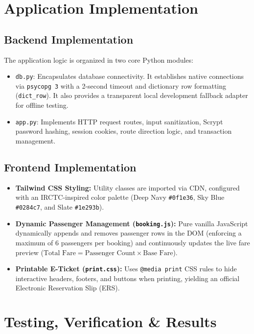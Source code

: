 \documentclass[12pt,a4paper]{report}
\begin{document}
\chapter{Application Implementation}

\section{Backend Implementation}
The application logic is organized in two core Python modules:
\begin{itemize}
    \item \texttt{db.py}: Encapsulates database connectivity. It establishes native connections via \texttt{psycopg 3} with a 2-second timeout and dictionary row formatting (\texttt{dict\_row}). It also provides a transparent local development fallback adapter for offline testing.
    \item \texttt{app.py}: Implements HTTP request routes, input sanitization, Scrypt password hashing, session cookies, route direction logic, and transaction management.
\end{itemize}

\section{Frontend Implementation}
\begin{itemize}
    \item \textbf{Tailwind CSS Styling:} Utility classes are imported via CDN, configured with an IRCTC-inspired color palette (Deep Navy \texttt{\#0f1e36}, Sky Blue \texttt{\#0284c7}, and Slate \texttt{\#1e293b}).
    \item \textbf{Dynamic Passenger Management (\texttt{booking.js}):} Pure vanilla JavaScript dynamically appends and removes passenger rows in the DOM (enforcing a maximum of 6 passengers per booking) and continuously updates the live fare preview ($\text{Total Fare} = \text{Passenger Count} \times \text{Base Fare}$).
    \item \textbf{Printable E-Ticket (\texttt{print.css}):} Uses \texttt{@media print} CSS rules to hide interactive headers, footers, and buttons when printing, yielding an official Electronic Reservation Slip (ERS).
\end{itemize}

\chapter{Testing, Verification \& Results}
\end{document}
